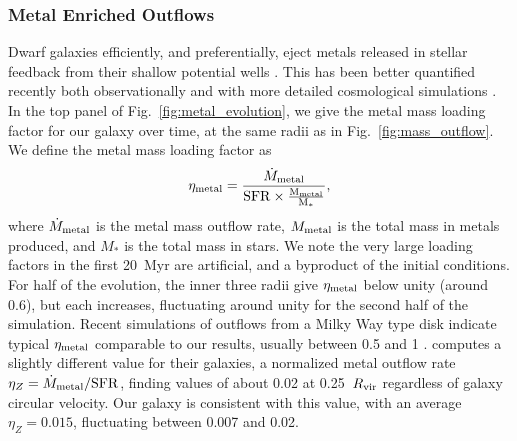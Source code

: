 \documentclass[twocolumn]{aastex61}
\begin{document}
\subsubsection{Metal Enriched Outflows}
Dwarf galaxies efficiently, and preferentially, eject metals released in stellar feedback from their shallow potential wells \citep{MacLowFerrara1999,FerraraTolstoy2000}. This has been better quantified recently both observationally \citep[e.g.][]{Kirby2011-metals,Zahid2012,Peeples2014,McQuinn2015} and with more detailed cosmological simulations \citep{Angles-Alcazar2017,Muratov2017}. In the top panel of Fig.~\ref{fig:metal_evolution}, we give the metal mass loading factor for our galaxy over time, at the same radii as in Fig.~\ref{fig:mass_outflow}. We define the metal mass loading factor as
\begin{equation}
\eta_{\rm metal} = \frac{\dot{M}_{\rm metal}}{\rm{SFR} \times \frac{M_{\rm metal}}{M_{*}}},
\end{equation}
where $\dot{M}_{\rm metal}$ is the metal mass outflow rate, $M_{\rm metal}$ is the total mass in metals produced, and $M_{*}$ is the total mass in stars. We note the very large loading factors in the first 20~Myr are artificial, and a byproduct of the initial conditions. For half of the evolution, the inner three radii give $\eta_{\rm metal}$ below unity (around 0.6), but each increases, fluctuating around unity for the second half of the simulation. Recent simulations of outflows from a Milky Way type disk indicate typical $\eta_{\rm metal}$ comparable to our results, usually between 0.5 and 1 \citep{Li2017,Fielding2017}. \cite{Muratov2017} computes a slightly different value for their galaxies, a normalized metal outflow rate $\eta_{Z} = \dot{M}_{\rm metal}/{\rm SFR}$, finding values of about 0.02 at 0.25~$R_{\rm vir}$ regardless of galaxy circular velocity. Our galaxy is consistent with this value, with an average $\eta_Z = 0.015$, fluctuating between 0.007 and 0.02.
\end{document}
